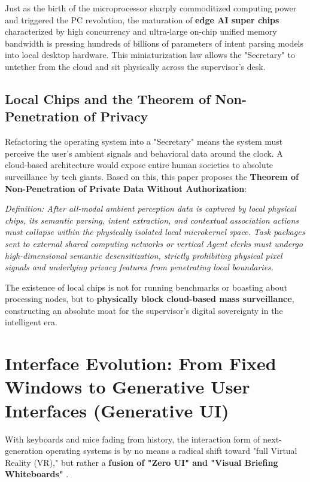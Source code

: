 \documentclass[11pt,a4paper]{article}
\newenvironment{customquote}
{\begin{mdframed}[backgroundcolor=blue!5, leftline=true, rightline=false, topline=false, bottomline=false, linecolor=blue!40, linewidth=2pt, innerleftmargin=10pt, innerrightmargin=10pt, innertopmargin=10pt, innerbottommargin=10pt]
\itshape}
{\end{mdframed}}
\begin{document}
Just as the birth of the microprocessor sharply commoditized computing power and triggered the PC revolution, the maturation of \textbf{edge AI super chips} characterized by high concurrency and ultra-large on-chip unified memory bandwidth is pressing hundreds of billions of parameters of intent parsing models into local desktop hardware. This miniaturization law allows the "Secretary" to untether from the cloud and sit physically across the supervisor's desk.

\subsection{Local Chips and the Theorem of Non-Penetration of Privacy}

Refactoring the operating system into a "Secretary" means the system must perceive the user's ambient signals and behavioral data around the clock. A cloud-based architecture would expose entire human societies to absolute surveillance by tech giants. Based on this, this paper proposes the \textbf{Theorem of Non-Penetration of Private Data Without Authorization}:

\begin{customquote}
Definition: After all-modal ambient perception data is captured by local physical chips, its semantic parsing, intent extraction, and contextual association actions must collapse within the physically isolated local microkernel space. Task packages sent to external shared computing networks or vertical Agent clerks must undergo high-dimensional semantic desensitization, strictly prohibiting physical pixel signals and underlying privacy features from penetrating local boundaries.
\end{customquote}

The existence of local chips is not for running benchmarks or boasting about processing nodes, but to \textbf{physically block cloud-based mass surveillance}, constructing an absolute moat for the supervisor's digital sovereignty in the intelligent era.

\section{Interface Evolution: From Fixed Windows to Generative User Interfaces (Generative UI)}

With keyboards and mice fading from history, the interaction form of next-generation operating systems is by no means a radical shift toward "full Virtual Reality (VR)," but rather a \textbf{fusion of "Zero UI" and "Visual Briefing Whiteboards"} \cite{norman2010}.
\end{document}
